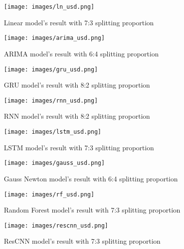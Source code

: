 \documentclass{ieeeojies}
\begin{document}
\begin{figure}[H]
  \centering
  \begin{minipage}{0.8\linewidth}
    \centering
    \texttt{[image: images/ln\_usd.png]}
    \caption{Linear model's result with 7:3 splitting proportion}
    \label{fig22}
  \end{minipage}
\end{figure}
\begin{figure}[H]
  \centering
  \begin{minipage}{0.8\linewidth}
    \centering
    \texttt{[image: images/arima\_usd.png]}
    \caption{ARIMA model's result with 6:4 splitting proportion}
    \label{fig23}
  \end{minipage}
\end{figure}
\begin{figure}[H]
  \centering
  \begin{minipage}{0.8\linewidth}
    \centering
    \texttt{[image: images/gru\_usd.png]}
    \caption{GRU model's result with 8:2 splitting proportion}
    \label{fig24}
  \end{minipage}
\end{figure}
\begin{figure}[H]
  \centering
  \begin{minipage}{0.8\linewidth}
    \centering
    \texttt{[image: images/rnn\_usd.png]}
    \caption{RNN model's result with 8:2 splitting proportion}
    \label{fig25}
  \end{minipage}
\end{figure}
\begin{figure}[H]
  \centering
  \begin{minipage}{0.8\linewidth}
    \centering
    \texttt{[image: images/lstm\_usd.png]}
    \caption{LSTM model's result with 7:3 splitting proportion}
    \label{fig26}
  \end{minipage}
\end{figure}
\begin{figure}[H]
  \centering
  \begin{minipage}{0.8\linewidth}
    \centering
        \texttt{[image: images/gauss\_usd.png]}
    \caption{Gauss Newton model's result with 6:4 splitting proportion}
    \label{fig27}
  \end{minipage}
\end{figure}
\begin{figure}[H]
  \centering
  \begin{minipage}{0.8\linewidth}
    \centering
        \texttt{[image: images/rf\_usd.png]}
    \caption{Random Forest model's result with 7:3 splitting proportion}
    \label{fig28}
  \end{minipage}
\end{figure}
\begin{figure}[H]
  \centering
  \begin{minipage}{0.8\linewidth}
    \centering
        \texttt{[image: images/rescnn\_usd.png]}
    \caption{ResCNN model's result with 7:3 splitting proportion}
    \label{fig28}
  \end{minipage}
\end{figure}
\end{document}
